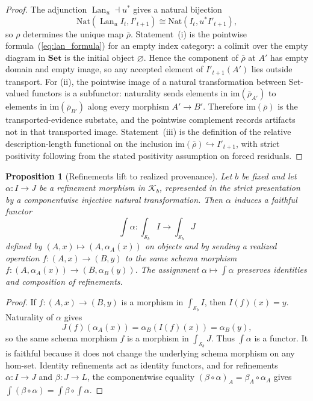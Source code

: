 \documentclass[11pt]{article}
\newtheorem{proposition}[theorem]{Proposition}
\theoremstyle{definition}
\newcommand{\K}{\mathcal{K}}
\newcommand{\Sschema}{\mathcal{S}}
\newcommand{\Set}{\mathbf{Set}}
\newcommand{\Lan}{\operatorname{Lan}}
\begin{document}
\begin{proof}
The adjunction $\Lan_u\dashv u^*$ gives a natural bijection
\[
\mathrm{Nat}(\Lan_u I_t,I'_{t+1})\cong \mathrm{Nat}(I_t,u^*I'_{t+1}),
\]
so $\rho$ determines the unique map $\bar\rho$. Statement~(i) is the pointwise formula~(\ref{eq:lan_formula}) for an empty index category: a colimit over the empty diagram in $\Set$ is the initial object $\varnothing$. Hence the component of $\bar\rho$ at $A'$ has empty domain and empty image, so any accepted element of $I'_{t+1}(A')$ lies outside transport. For (ii), the pointwise image of a natural transformation between Set-valued functors is a subfunctor: naturality sends elements in $\mathrm{im}(\bar\rho_{A'})$ to elements in $\mathrm{im}(\bar\rho_{B'})$ along every morphism $A'\to B'$. Therefore $\mathrm{im}(\bar\rho)$ is the transported-evidence substate, and the pointwise complement records artifacts not in that transported image. Statement~(iii) is the definition of the relative description-length functional on the inclusion $\mathrm{im}(\bar\rho)\hookrightarrow I'_{t+1}$, with strict positivity following from the stated positivity assumption on forced residuals.
\end{proof}

\begin{proposition}[Refinements lift to realized provenance]
\label{prop:elements_functoriality}
Let $b$ be fixed and let $\alpha:I\to J$ be a refinement morphism in $\K_b$, represented in the strict presentation by a componentwise injective natural transformation. Then $\alpha$ induces a faithful functor
\[
\int\alpha:\int_{\Sschema_b} I\longrightarrow \int_{\Sschema_b} J
\]
defined by $(A,x)\mapsto (A,\alpha_A(x))$ on objects and by sending a realized operation $f:(A,x)\to(B,y)$ to the same schema morphism $f:(A,\alpha_A(x))\to(B,\alpha_B(y))$. The assignment $\alpha\mapsto\int\alpha$ preserves identities and composition of refinements.
\end{proposition}

\begin{proof}
If $f:(A,x)\to(B,y)$ is a morphism in $\int_{\Sschema_b}I$, then $I(f)(x)=y$. Naturality of $\alpha$ gives
\[
J(f)(\alpha_A(x))=\alpha_B(I(f)(x))=\alpha_B(y),
\]
so the same schema morphism $f$ is a morphism in $\int_{\Sschema_b}J$. Thus $\int\alpha$ is a functor. It is faithful because it does not change the underlying schema morphism on any hom-set. Identity refinements act as identity functors, and for refinements $\alpha:I\to J$ and $\beta:J\to L$, the componentwise equality $(\beta\circ\alpha)_A=\beta_A\circ\alpha_A$ gives $\int(\beta\circ\alpha)=\int\beta\circ\int\alpha$.
\end{proof}
\end{document}
